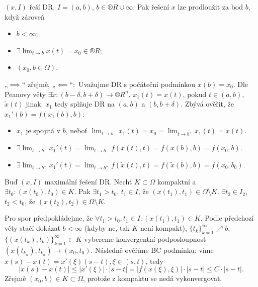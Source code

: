 \documentclass[12pt]{article}					%
\begin{document}
\begin{lemma}
	$(x, I)$ řeší DR, $I = (a, b)$, $b \in ®R \cup ∞$. Pak řešení $x$ lze prodloužit za bod $b$, když zároveň

	\begin{itemize}
		\item $b < ∞$;
		\item $\exists \lim_{t \rightarrow b} x(t) = x_0 \in ®R$;
		\item $(x_0, b \in \Omega)$.
	\end{itemize}

	\begin{dukazin}
		„$\implies$“ zřejmě, „$\impliedby$“: Uvažujme DR s počáteční podmínkou $x(b) = x_0$. Dle Peanovy věty $\exists \tilde x: (b - \delta, b + \delta) \rightarrow ®R^n$. $x_1(t) = x(t)$, pokud $t \in (a, b)$, $\tilde x(t)$ jinak. $x_1$ tedy splňuje DR na $(a, b)$ a $(b, b + \delta)$. Zbývá ověřit, že $x_1'(b) = f(x_1(b), b)$:

		\begin{itemize}
			\item $x_1$ je spojitá v $b$, neboť $\lim_{t \rightarrow b^-} x_1(t) = x_0 = \lim_{t \rightarrow b^+} x_1(t) = \tilde x(t)$.
			\item $\exists \lim_{t \rightarrow b^-} x_1'(t) = \lim_{t \rightarrow b^-} f(x(t), t) = f(x(b), b) = f(x_0, b)$.
			\item $\exists \lim_{t \rightarrow b^+} x_1'(t) = \lim_{t \rightarrow b^+} f(\tilde x(t), t) = f(\tilde x(b), b) = f(x_0, b_0)$.
		\end{itemize}
	\end{dukazin}
\end{lemma}

\begin{veta}
	Buď $(x, I)$ maximální řešení DR. Nechť $K \subset \Omega$ kompaktní a $\exists t_0: (x(t_0), t_0) \in K$. Pak $\exists t_1 > t_0$, $t_1 \in I$, že $(x(t_1), t_1) \in \Omega \setminus K$. $\exists t_2 \in I_2$, $t_2 < t_0$, že $(x(t_2), t_2) \in \Omega \setminus K$.

	\begin{dukazin}
		Pro spor předpokládejme, že $\forall t_1 > t_0, t_1 \in I: (x(t_1), t_1) \in K$. Podle předchozí věty stačí dokázat $b < ∞$ (kdyby ne, tak $K$ není kompakt), $\{t_k\}_{k=1}^∞ \nearrow b$, $\{(x(t_k), t_k)\}_{k=1}^∞ \subset K$ vybereme konvergentní podposloupnost $(x(t_{k_n}), t_{k_n}) \rightarrow (x_0, t_0)$. Následně ověříme BC podmínku: víme $x(s) - x(t) = x'(\xi)(s - t), \xi \in (s, t)$, tedy
		$$ |x(s) - x(t)| ≤ |x'(\xi)|·|s - t| = |f(x(\xi), \xi)|·|s - t| ≤ C · |s - t|. $$
		Zřejmě $(x_0, b) \in K \subset \Omega$, protože z kompaktu se nedá vykonvergovat.
	\end{dukazin}
\end{veta}
\end{document}
